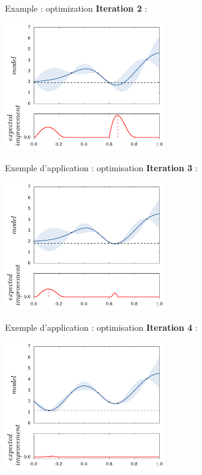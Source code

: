 \documentclass{beamer}
\begin{document}
\begin{frame}{Example : optimization}
\textbf{Iteration 2} :\\
\begin{center}
\includegraphics[height=5.5cm]{figures/python/ego_EI1}
\end{center}
\end{frame}

\begin{frame}{Exemple d'application : optimisation}
\textbf{Iteration 3} :\\
\begin{center}
\includegraphics[height=5.5cm]{figures/python/ego_EI2}
\end{center}
\end{frame}

\begin{frame}{Exemple d'application : optimisation}
\textbf{Iteration 4} :\\
\begin{center}
\includegraphics[height=5.5cm]{figures/python/ego_EI3}
\end{center}
\end{frame}
\end{document}
